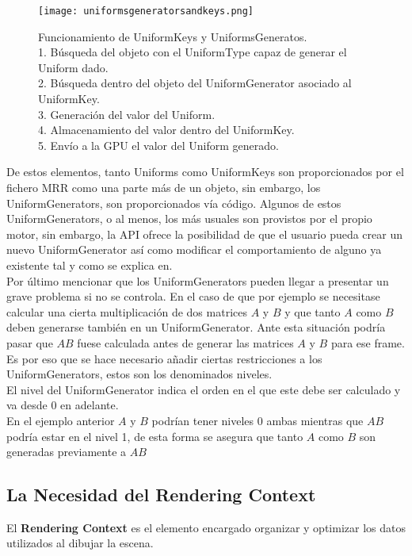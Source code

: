 \begin{figure}[h!]
\begin{center}
\texttt{[image: uniformsgeneratorsandkeys.png]}
\end{center}
\caption[Funcionamiento de UniformKeys y UniformsGenerators]{Funcionamiento de UniformKeys y UniformsGeneratos.\\
1. Búsqueda del objeto con el UniformType capaz de generar el Uniform dado.\\
2. Búsqueda dentro del objeto del UniformGenerator asociado al UniformKey.\\
3. Generación del valor del Uniform.\\
4. Almacenamiento del valor dentro del UniformKey.\\
5. Envío a la GPU el valor del Uniform generado.}
\label{fig:unifkeysandgen}
\end{figure}

De estos elementos, tanto Uniforms como UniformKeys son proporcionados por el fichero MRR como una parte más de un objeto, sin embargo, los UniformGenerators, son proporcionados vía código. Algunos de estos UniformGenerators, o al menos, los más usuales son provistos por el propio motor, sin embargo, la API ofrece la posibilidad de que el usuario pueda crear un nuevo UniformGenerator así como modificar el comportamiento de alguno ya existente tal y como se explica en.\\

Por último mencionar que los UniformGenerators pueden llegar a presentar un grave problema si no se controla. En el caso de que por ejemplo se necesitase calcular una cierta multiplicación de dos matrices $A$ y $B$ y que tanto $A$ como $B$ deben generarse también en un UniformGenerator. Ante esta situación podría pasar que $AB$ fuese calculada antes de generar las matrices $A$ y $B$ para ese frame. Es por eso que se hace necesario añadir ciertas restricciones a los UniformGenerators, estos son los denominados niveles.\\
El nivel del UniformGenerator indica el orden en el que este debe ser calculado y va desde 0 en adelante.\\
En el ejemplo anterior $A$ y $B$ podrían tener niveles 0 ambas mientras que $AB$ podría estar en el nivel 1, de esta forma se asegura que tanto $A$ como $B$ son generadas previamente a $AB$\\

\subsection{La Necesidad del Rendering Context}
El \textbf{Rendering Context} es el elemento encargado organizar y optimizar los datos utilizados al dibujar la escena.\\

